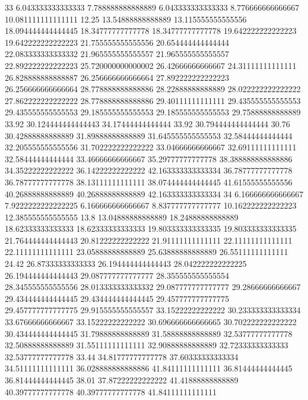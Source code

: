 33 6.043333333333333 7.788888888888889 6.043333333333333 8.776666666666667 10.081111111111111 12.25 13.54888888888889 13.115555555555556 18.094444444444445 18.34777777777778 18.34777777777778 19.642222222222223 19.642222222222223 21.755555555555556 20.654444444444444 22.083333333333332 21.965555555555557 21.965555555555557 22.892222222222223 25.720000000000002 26.42666666666667 24.31111111111111 26.828888888888887 26.256666666666664 27.892222222222223 26.256666666666664 28.778888888888886 28.22888888888889 28.022222222222222 27.862222222222222 28.778888888888886 29.40111111111111 29.435555555555553 29.435555555555553 29.185555555555553 29.185555555555553 29.75888888888889 33.92 30.124444444444443 34.17444444444444 33.92 30.794444444444444 30.76 30.42888888888889 31.89888888888889 31.645555555555553 32.58444444444444 32.205555555555556 31.702222222222222 33.04666666666667 32.69111111111111 32.58444444444444 33.46666666666667 35.29777777777778 38.388888888888886 34.35222222222222 36.14222222222222 42.163333333333334 36.78777777777778 36.78777777777778 38.13111111111111 38.074444444444445 41.61555555555556 40.26888888888889 40.26888888888889 42.163333333333334
34 6.166666666666667 7.9222222222222225 6.166666666666667 8.837777777777777 10.162222222222223 12.385555555555555 13.8 13.04888888888889 18.24888888888889 18.62333333333333 18.62333333333333 19.803333333333335 19.803333333333335 21.764444444444443 20.81222222222222 21.91111111111111 22.11111111111111 22.11111111111111 23.05888888888889 25.63888888888889 26.55111111111111 24.42 26.87333333333333 26.194444444444443 28.042222222222225 26.194444444444443 29.087777777777777 28.355555555555554 28.345555555555556 28.013333333333332 29.087777777777777 29.28666666666667 29.434444444444445 29.434444444444445 29.457777777777775 29.457777777777775 29.915555555555557 33.15222222222222 30.233333333333334 33.67666666666667 33.15222222222222 30.696666666666665 30.702222222222222 30.434444444444445 31.79888888888889 31.58888888888889 32.53777777777778 32.50888888888889 31.55111111111111 32.90888888888889 32.72333333333333 32.53777777777778 33.44 34.81777777777778 37.60333333333334 34.51111111111111 36.028888888888886 41.84111111111111 36.81444444444445 36.81444444444445 38.01 37.87222222222222 41.41888888888889 40.39777777777778 40.39777777777778 41.84111111111111
